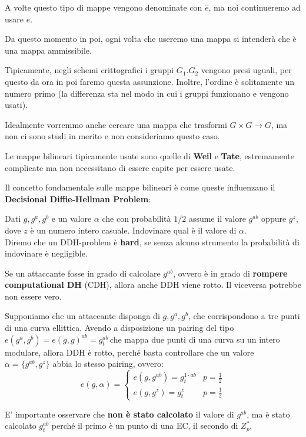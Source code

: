 \begin{remark}
A volte questo tipo di mappe vengono denominate con $\hat{e}$, ma noi continueremo ad usare $e$.
\end{remark}
\begin{remark}
Da questo momento in poi, ogni volta che useremo una mappa si intenderà che è una mappa ammissibile.
\end{remark}
Tipicamente, negli schemi crittografici i gruppi $G_1.G_2$ vengono presi uguali, per questo da ora in poi faremo questa assunzione. Inoltre, l'ordine è solitamente un numero primo (la differenza sta nel modo in cui i gruppi funzionano e vengono usati).\\
\begin{remark}
Idealmente vorremmo anche cercare una mappa che trasformi $G\times G\longrightarrow G$, ma non ci sono studi in merito e non consideriamo questo caso.
\end{remark}
\begin{remark}
Le mappe bilineari tipicamente usate sono quelle di \textbf{Weil} e \textbf{Tate}, estremamente complicate ma non necessitano di essere capite per essere usate.
\end{remark}
Il concetto fondamentale sulle mappe bilineari è come queste influenzano il \textbf{Decisional Diffie-Hellman Problem}:
\begin{definition}\label{def:ddh}
Dati $g,g^a,g^b$ e un valore $\alpha$ che con probabilità $1/2$ assume il valore $g^{ab}$ oppure $g^z$, dove $z$ è un numero intero casuale. Indovinare qual è il valore di $\alpha$.\\
Diremo che un DDH-problem è \textbf{hard}, se senza alcuno strumento la probabilità di indovinare è negligible.
\end{definition}
\begin{remark}
Se un attaccante fosse in grado di calcolare $g^{ab}$, ovvero è in grado di \textbf{rompere computational DH} (CDH), allora anche DDH viene rotto. Il viceversa potrebbe non essere vero.
\end{remark}
\begin{example}
Supponiamo che un attaccante disponga di $g,g^a,g^b$, che corrispondono a tre punti di una curva ellittica. Avendo a disposizione un pairing del tipo $e(g^a,g^b)=e(g,g)^{ab}=g_t^{ab}$\footnotemark \,che mappa due punti di una curva su un intero modulare, allora DDH è rotto, perché basta controllare che un valore $\alpha=\{g^{ab},g^{z}\}$ abbia lo stesso pairing, ovvero: 
\[
e(g,\alpha)=\begin{cases}
e(g,g^{ab})=g^{1\cdot ab}_t&p=\frac{1}{2}\\
e(g,g^z)=g^z_t&p=\frac{1}{2}
\end{cases}
\]
\begin{remark}
E' importante osservare che \textbf{non è stato calcolato} il valore di $g^{ab}$, ma è stato calcolato $g_t^{ab}$ perché il primo è un punto di una EC, il secondo di $Z_p^*$.
\end{remark}
\end{example}
